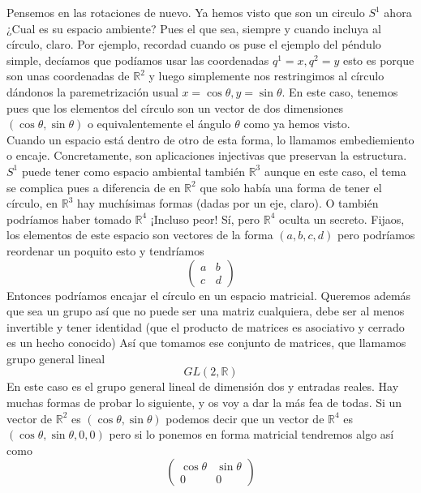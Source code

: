 \documentclass[12pt]{article}
\begin{document}
Pensemos en las rotaciones de nuevo. Ya hemos visto que son un circulo $S^1$ ahora ¿Cual es su espacio ambiente? Pues el que sea, siempre y cuando incluya al círculo, claro. Por ejemplo, recordad cuando os puse el ejemplo del péndulo simple, decíamos que podíamos usar las coordenadas $q^1=x, q^2=y$ esto es porque son unas coordenadas de $\mathbb{R}^2$ y luego simplemente nos restringimos al círculo dándonos la paremetrización usual $x=\cos\theta, y=\sin\theta$. En este caso, tenemos pues que los elementos del círculo son un vector de dos dimensiones $(\cos\theta, \sin\theta)$ o equivalentemente el ángulo $\theta$ como ya hemos visto. \\ Cuando un espacio está dentro de otro de esta forma, lo llamamos embediemiento o encaje. Concretamente, son aplicaciones injectivas que preservan la estructura. $S^1$ puede tener como espacio ambiental también $\mathbb{R}^3$ aunque en este caso, el tema se complica pues a diferencia de en $\mathbb{R}^2$ que solo había una forma de tener el círculo, en $\mathbb{R}^3$ hay muchísimas formas (dadas por un eje, claro). O también podríamos haber tomado $\mathbb{R}^4$ ¡Incluso peor! Sí, pero $\mathbb{R}^4$ oculta un secreto. Fijaos, los elementos de este espacio son vectores  de la forma $(a,b,c,d)$ pero podríamos reordenar un poquito esto y tendríamos 
\begin{equation*}
    \begin{pmatrix}
        a & b \\ c & d
    \end{pmatrix}
\end{equation*}
Entonces podríamos encajar el círculo en un espacio matricial. Queremos además que sea un grupo así que no puede ser una matriz cualquiera, debe ser al menos invertible y tener identidad (que el producto de matrices es asociativo y cerrado es un hecho conocido) Así que tomamos ese conjunto de matrices, que llamamos grupo general lineal
\begin{equation}
    GL(2,\mathbb{R})
\end{equation}
En este caso es el grupo general lineal de dimensión dos y entradas reales. Hay muchas formas de probar lo siguiente, y os voy a dar la más fea de todas. Si un vector de $\mathbb{R}^2$ es $(\cos\theta, \sin\theta)$
podemos decir que un vector de $\mathbb{R}^4$ es $(\cos\theta, \sin\theta, 0, 0)$ pero si lo ponemos en forma matricial tendremos algo así como
\begin{equation*}
    \begin{pmatrix}
        \cos\theta & \sin\theta \\  0& 0
    \end{pmatrix}
\end{equation*}
\end{document}
